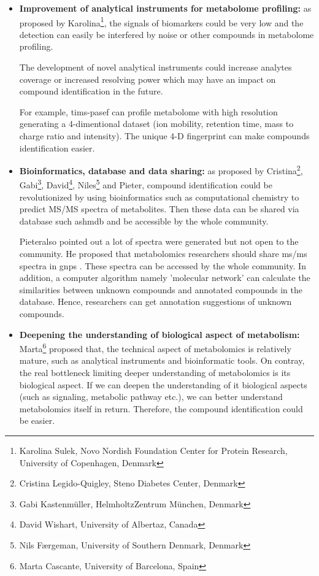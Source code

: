 \begin{itemize}
    \item \textbf{Improvement of analytical instruments for metabolome profiling:} as proposed by Karolina\footnote{Karolina Sulek, Novo Nordish Foundation Center for Protein Research, University of Copenhagen, Denmark}, the signals of biomarkers could be very low and the detection can easily be interfered by noise or other compounds in metabolome profiling. 
    
    The development of novel analytical instruments could increase analytes coverage or increased resolving power which may have an impact on compound identification in the future.
    
    For example, \acrfull{tims-pasef} can profile metabolome with high resolution generating a 4-dimentional dataset (ion mobility, retention time, mass to charge ratio and intensity). The unique 4-D fingerprint can make compounds identification easier.
    
    \item \textbf{Bioinformatics, database and data sharing:} as proposed by Cristina\footnote{Cristina Legido-Quigley, Steno Diabetes Center, Denmark}, Gabi\footnote{Gabi Kastenmüller, HelmholtzZentrum München, Denmark}, David\footnote{David Wishart, University of Albertaz, Canada}, Niles\footnote{Nils Færgeman, University of Southern Denmark, Denmark} and Pieter\footnotemark, compound identification could be revolutionized by using bioinformatics such as computational chemistry to predict MS/MS spectra of metabolites. Then these data can be shared via database such as\acrfull{hmdb} \cite{hmdb} and be accessible by the whole community.
    
    Pieter\footnotemark[\value{footnote}] also pointed out a lot of spectra were generated but not open to the community. He proposed that metabolomics researchers should share \acrshort{ms/ms} spectra in \acrfull{gnps} \cite{GNPS}. These spectra can be accessed by the whole community. In addition, a computer algorithm namely 'molecular network' can calculate the similarities between unknown compounds and annotated compounds in the database. Hence, researchers can get annotation suggestions of unknown compounds. 
    
    \item \textbf {Deepening the understanding of biological aspect of metabolism:}     Marta\footnote{Marta Cascante, University of Barcelona, Spain} proposed that, the technical aspect of metabolomics is relatively mature, such as analytical instruments and bioinformatic tools. On contray, the real bottleneck limiting deeper understanding of metabolomics is its biological aspect. If we can deepen the understanding of it biological aspects (such as signaling, metabolic pathway etc.), we can better understand metabolomics itself in return. Therefore, the compound identification could be easier.
 

\end{itemize}
